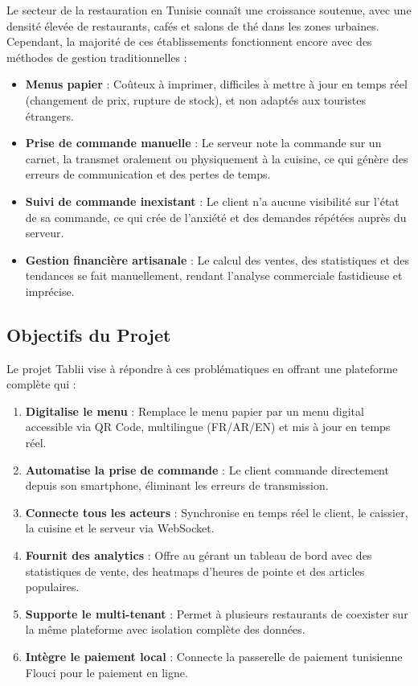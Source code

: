 \documentclass[12pt,a4paper]{report}
\begin{document}
Le secteur de la restauration en Tunisie connaît une croissance soutenue, avec une densité élevée de restaurants, cafés et salons de thé dans les zones urbaines. Cependant, la majorité de ces établissements fonctionnent encore avec des méthodes de gestion traditionnelles :

\begin{itemize}[leftmargin=1.5cm, itemsep=0.3cm]
    \item \textbf{Menus papier} : Coûteux à imprimer, difficiles à mettre à jour en temps réel (changement de prix, rupture de stock), et non adaptés aux touristes étrangers.
    \item \textbf{Prise de commande manuelle} : Le serveur note la commande sur un carnet, la transmet oralement ou physiquement à la cuisine, ce qui génère des erreurs de communication et des pertes de temps.
    \item \textbf{Suivi de commande inexistant} : Le client n'a aucune visibilité sur l'état de sa commande, ce qui crée de l'anxiété et des demandes répétées auprès du serveur.
    \item \textbf{Gestion financière artisanale} : Le calcul des ventes, des statistiques et des tendances se fait manuellement, rendant l'analyse commerciale fastidieuse et imprécise.
\end{itemize}

\subsection{Objectifs du Projet}

Le projet Tablii vise à répondre à ces problématiques en offrant une plateforme complète qui :

\begin{enumerate}[leftmargin=1.5cm, itemsep=0.3cm]
    \item \textbf{Digitalise le menu} : Remplace le menu papier par un menu digital accessible via QR Code, multilingue (FR/AR/EN) et mis à jour en temps réel.
    \item \textbf{Automatise la prise de commande} : Le client commande directement depuis son smartphone, éliminant les erreurs de transmission.
    \item \textbf{Connecte tous les acteurs} : Synchronise en temps réel le client, le caissier, la cuisine et le serveur via WebSocket.
    \item \textbf{Fournit des analytics} : Offre au gérant un tableau de bord avec des statistiques de vente, des heatmaps d'heures de pointe et des articles populaires.
    \item \textbf{Supporte le multi-tenant} : Permet à plusieurs restaurants de coexister sur la même plateforme avec isolation complète des données.
    \item \textbf{Intègre le paiement local} : Connecte la passerelle de paiement tunisienne Flouci pour le paiement en ligne.
\end{enumerate}
\end{document}
